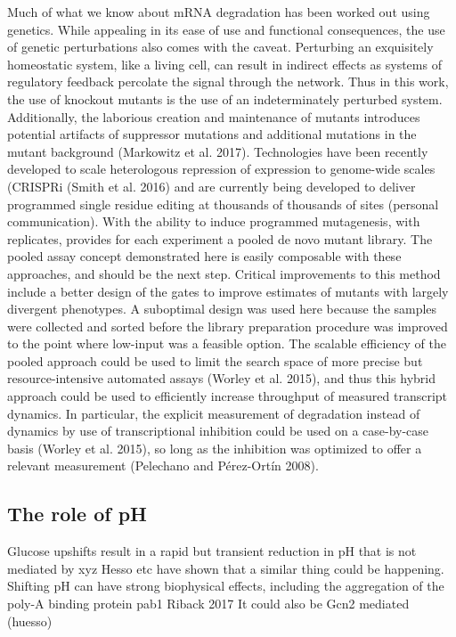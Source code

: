 Much of what we know about mRNA
degradation has been worked out using genetics. While appealing in its
ease of use and functional consequences, the use of genetic
perturbations also comes with the caveat. Perturbing an exquisitely
homeostatic system, like a living cell, can result in indirect effects
as systems of regulatory feedback percolate the signal through the
network. Thus in this work, the use of knockout mutants is the use of
an indeterminately perturbed system. Additionally, the laborious
creation and maintenance of mutants introduces potential artifacts of
suppressor mutations and additional mutations in the mutant background
(Markowitz et al. 2017). Technologies have been recently developed to
scale heterologous repression of expression to genome-wide scales
(CRISPRi (Smith et al. 2016) and are currently being developed to
deliver programmed single residue editing at thousands of thousands of
sites (personal communication). With the ability to induce programmed
mutagenesis, with  replicates, provides for each experiment a pooled
de novo mutant library. The pooled assay concept demonstrated here is
easily composable with these approaches, and should be the next step.
Critical improvements to this method include a better design of the
gates to improve estimates of mutants with largely divergent
phenotypes. A suboptimal design was used here because the samples were
collected and sorted before the library preparation procedure was
improved to the point where low-input was a feasible option.  The
scalable efficiency of the pooled approach could be used to limit the
search space of more precise but resource-intensive automated assays
(Worley et al. 2015), and thus this hybrid approach could be used to
efficiently increase throughput of measured transcript dynamics. In
particular, the explicit measurement of degradation instead of
dynamics by use of transcriptional inhibition could be used on a
case-by-case basis (Worley et al. 2015), so long as the inhibition was
optimized to offer a relevant measurement (Pelechano and Pérez-Ortín
2008).

\subsection{The role of pH}

Glucose upshifts result in a rapid but transient reduction in pH
that is not mediated by xyz
\parencite{kresnowati2008quantitative}
Hesso etc have shown that a similar thing could be happening.
Shifting pH can have strong biophysical effects, including
the aggregation of the poly-A binding protein pab1
Riback 2017
It could also be Gcn2 mediated (huesso)

